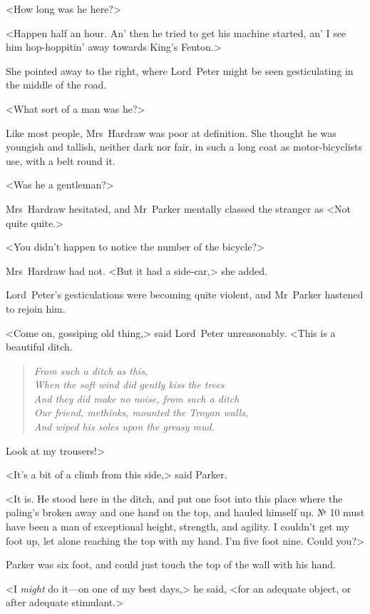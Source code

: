 <How long was he here?>

<Happen half an hour. An' then he tried to get his machine started, an' I see him hop-hoppitin' away towards King's Fenton.>

She pointed away to the right, where Lord~Peter might be seen gesticulating in the middle of the road.

<What sort of a man was he?>

Like most people, Mrs~Hardraw was poor at definition. She thought he was youngish and tallish, neither dark nor fair, in such a long coat as motor-bicyclists use, with a belt round it.

<Was he a gentleman?>

Mrs~Hardraw hesitated, and Mr~Parker mentally classed the stranger as <Not quite quite.>

<You didn't happen to notice the number of the bicycle?>

Mrs~Hardraw had not. <But it had a side-car,> she added.

Lord~Peter's gesticulations were becoming quite violent, and Mr~Parker hastened to rejoin him.

<Come on, gossiping old thing,> said Lord~Peter unreasonably. <This is a beautiful ditch.
\vspace{-2ex}
\begin{quote}\itshape
From such a ditch as this,\\
When the soft wind did gently kiss the trees\\
And they did make no noise, from such a ditch\\
Our friend, methinks, mounted the Troyan walls,\\
And wiped his soles upon the greasy mud.\\
\end{quote}
\vspace{-5ex}
Look at my trousers!>

<It's a bit of a climb from this side,> said Parker.

<It is. He stood here in the ditch, and put one foot into this place where the paling's broken away and one hand on the top, and hauled himself up. № 10 must have been a man of exceptional height, strength, and agility. I couldn't get my foot up, let alone reaching the top with my hand. I'm five foot nine. Could you?>

Parker was six foot, and could just touch the top of the wall with his hand.

<I \emph{might} do it—on one of my best days,> he said, <for an adequate object, or after adequate stimulant.>

